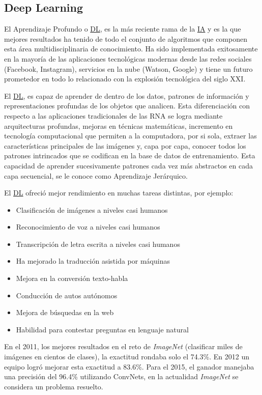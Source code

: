 \subsection{Deep Learning}

El Aprendizaje Profundo o \hyperlink{abbr}{DL}, es la más reciente rama de la
\hyperlink{abbr}{IA} y es la que mejores resultados ha tenido de todo el
conjunto de algoritmos que componen esta área multidisciplinaria de
conocimiento. Ha sido implementada exitosamente en la mayoría de las
aplicaciones tecnológicas modernas desde las redes sociales (Facebook,
Instagram), servicios en la nube (Watson, Google) y tiene un futuro prometedor
en todo lo relacionado con la explosión tecnológica del siglo XXI.

El \hyperlink{abbr}{DL}, es capaz de aprender de dentro de los datos, patrones
de información y representaciones profundas de los objetos que analicen. Esta
diferenciación con respecto a las aplicaciones tradicionales de las RNA se logra
mediante arquitecturas profundas, mejoras en técnicas matemáticas, incremento en
tecnología computacional que permiten a la computadora, por si sola, extraer las
características principales de las imágenes y, capa por capa, conocer todos los
patrones intrincados que se codifican en la base de datos de entrenamiento. Esta
capacidad de aprender sucesivamente patrones cada vez más abstractos en cada
capa secuencial, se le conoce como Aprendizaje Jerárquico. 

El \hyperlink{abbr}{DL} ofreció mejor rendimiento en muchas tareas distintas, por ejemplo:

\begin{itemize}
    \item Clasificación de imágenes a niveles casi humanos
    \item Reconocimiento de voz a niveles casi humanos
    \item Transcripción de letra escrita a niveles casi humanos
    \item Ha mejorado la traducción asistida por máquinas
    \item Mejora en la conversión texto-habla
    \item Conducción de autos autónomos
    \item Mejora de búsquedas en la web
    \item Habilidad para contestar preguntas en lenguaje natural
\end{itemize}

En el 2011, los mejores resultados en el reto de \emph{ImageNet} (clasificar
miles de imágenes en cientos de clases), la exactitud rondaba solo el 74.3\%. En
2012 un equipo logró mejorar esta exactitud a 83.6\%. Para el 2015, el ganador
manejaba una precisión del 96.4\% utilizando ConvNets, en la actualidad
\emph{ImageNet} se considera un problema resuelto.

